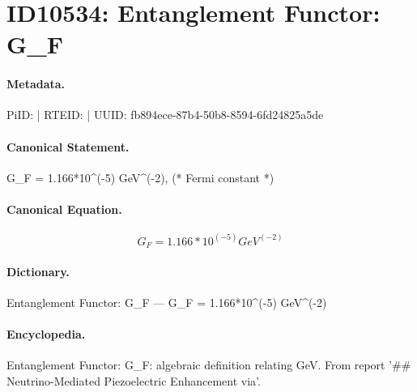 \section*{ID10534: Entanglement Functor: G\_F}
\paragraph{Metadata.}
PiID:  | RTEID:  | UUID: fb894ece-87b4-50b8-8594-6fd24825a5de

\paragraph{Canonical Statement.}
G\_F = 1.166*10\textasciicircum{}(-5) GeV\textasciicircum{}(-2), (* Fermi constant *)

\paragraph{Canonical Equation.}
\[
G_F = 1.166*10^(-5) GeV^(-2)
\]

\paragraph{Dictionary.}
Entanglement Functor: G\_F — G\_F = 1.166*10\textasciicircum{}(-5) GeV\textasciicircum{}(-2)

\paragraph{Encyclopedia.}
Entanglement Functor: G\_F: algebraic definition relating GeV. From report '\#\# Neutrino-Mediated Piezoelectric Enhancement via'.
